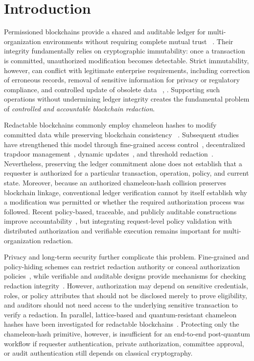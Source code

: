 \documentclass[lettersize,journal]{IEEEtran}
\begin{document}
    \section{Introduction}
    
    Permissioned blockchains provide a shared and auditable ledger for
    multi-organization environments without requiring complete mutual
    trust {~\cite{ref7}}. Their integrity fundamentally relies on cryptographic
    immutability: once a transaction is committed, unauthorized
    modification becomes detectable. Strict immutability, however, can
    conflict with legitimate enterprise requirements, including correction
    of erroneous records, removal of sensitive information for privacy or
    regulatory compliance, and controlled update of obsolete
    data~\cite{ref9,ref21,ref22} {, \cite{ref38}}. Supporting such operations without
    undermining ledger integrity creates the fundamental problem of
    \emph{controlled and accountable blockchain redaction}.
    
    Redactable blockchains commonly employ chameleon hashes to modify
    committed data while preserving blockchain consistency
    ~\textcolor{red}{\cite{ref1,ref2,ref6}}. Subsequent studies have strengthened this
    model through fine-grained access control~\cite{ref8,ref15},
    decentralized trapdoor management~\cite{ref3,ref19}, dynamic
    updates~\cite{ref5,ref16}, and threshold redaction~\cite{ref27}.
    Nevertheless, preserving the ledger commitment alone does not establish
    that a requester is authorized for a particular transaction, operation,
    policy, and current state. Moreover, because an authorized
    chameleon-hash collision preserves blockchain linkage, conventional
    ledger verification cannot by itself establish why a modification was
    permitted or whether the required authorization process was followed.
    Recent policy-based, traceable, and publicly auditable constructions
    improve accountability~\cite{ref33,ref34,ref35}, but integrating
    request-level policy validation with distributed authorization and
    verifiable execution remains important for multi-organization
    redaction.
    
    Privacy and long-term security further complicate this problem.
    Fine-grained and policy-hiding schemes can restrict redaction authority
    or conceal authorization policies~\cite{ref4,ref18,ref31,ref34}, while
    verifiable and auditable designs provide mechanisms for checking
    redaction integrity~\cite{ref13,ref20,ref33}. However, authorization
    may depend on sensitive credentials, roles, or policy attributes that
    should not be disclosed merely to prove eligibility, and auditors
    should not need access to the underlying sensitive transaction to
    verify a redaction. In parallel, lattice-based and quantum-resistant
    chameleon hashes have been investigated for redactable
    blockchains~\cite{ref10,ref11,ref17,ref37}. Protecting only the
    chameleon-hash primitive, however, is insufficient for an end-to-end
    post-quantum workflow if requester authentication, private
    authorization, committee approval, or audit authentication still
    depends on classical cryptography.
    
\end{document}
